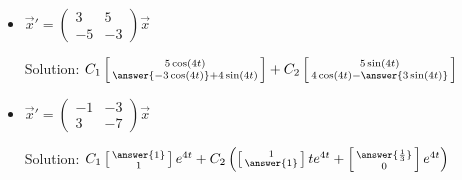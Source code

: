 \documentclass{ximera}
\begin{document}
\begin{exercise}
\begin{itemize}
        \item $\vec{x}'=\begin{pmatrix} 3& 5\\ -5& -3  \end{pmatrix}\vec{x}$ %
            \begin{multipleChoice}
            \end{multipleChoice}
            Solution:  $C_1\left[\begin{smallmatrix} 5\cos(4t) \\ \answer{-3\cos(4t)} + 4\sin(4t) \end{smallmatrix}\right] + C_2 \left[\begin{smallmatrix} 5\sin(4t)\\ 4\cos(4t) - \answer{3\sin(4t)} \end{smallmatrix}\right]$ \\
            
        \item $\vec{x}' = \begin{pmatrix} -1 & -3 \\ 3 & -7 \end{pmatrix}\vec{x}$ %
            \begin{multipleChoice}
            \end{multipleChoice}
            Solution: $C_1\left[\begin{smallmatrix} \answer{1} \\ 1 \end{smallmatrix}\right]e^{4t} + C_2\left(\left[\begin{smallmatrix} 1 \\ \answer{1}  \end{smallmatrix}\right]te^{4t} + \left[\begin{smallmatrix} \answer{\frac{1}{3}} \\ 0 \end{smallmatrix}\right]e^{4t}\right)$  \\
            

\end{itemize}
\end{exercise}
\end{document}
